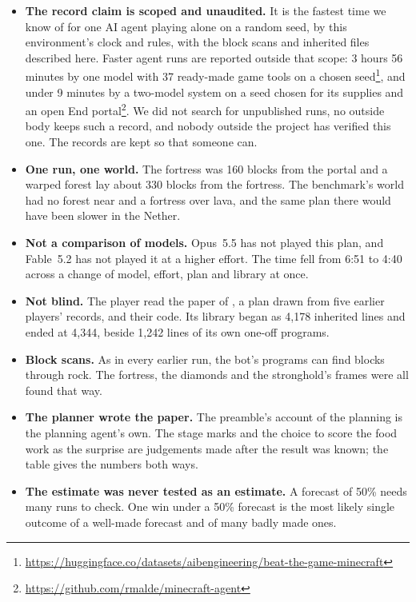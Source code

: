 \documentclass[11pt,a4paper]{article}
\begin{document}
\begin{itemize}
\item \textbf{The record claim is scoped and unaudited.} It is the fastest time we know of for one AI agent playing alone on a random seed, by this environment's clock and rules, with the block scans and inherited files described here. Faster agent runs are reported outside that scope: 3 hours 56 minutes by one model with 37 ready-made game tools on a chosen seed\footnote{\url{https://huggingface.co/datasets/aibengineering/beat-the-game-minecraft}}, and under 9 minutes by a two-model system on a seed chosen for its supplies and an open End portal\footnote{\url{https://github.com/rmalde/minecraft-agent}}. We did not search for unpublished runs, no outside body keeps such a record, and nobody outside the project has verified this one. The records are kept so that someone can.
\item \textbf{One run, one world.} The fortress was 160 blocks from the portal and a warped forest lay about 330 blocks from the fortress. The benchmark's world had no forest near and a fortress over lava, and the same plan there would have been slower in the Nether.
\item \textbf{Not a comparison of models.} Opus~5.5 has not played this plan, and Fable~5.2 has not played it at a higher effort. The time fell from 6:51 to 4:40 across a change of model, effort, plan and library at once.
\item \textbf{Not blind.} The player read the paper of \citet{faldor2026team}, a plan drawn from five earlier players' records, and their code. Its library began as 4,178 inherited lines and ended at 4,344, beside 1,242 lines of its own one-off programs.
\item \textbf{Block scans.} As in every earlier run, the bot's programs can find blocks through rock. The fortress, the diamonds and the stronghold's frames were all found that way.
\item \textbf{The planner wrote the paper.} The preamble's account of the planning is the planning agent's own. The stage marks and the choice to score the food work as the surprise are judgements made after the result was known; the table gives the numbers both ways.
\item \textbf{The estimate was never tested as an estimate.} A forecast of 50\% needs many runs to check. One win under a 50\% forecast is the most likely single outcome of a well-made forecast and of many badly made ones.
\end{itemize}
\end{document}
